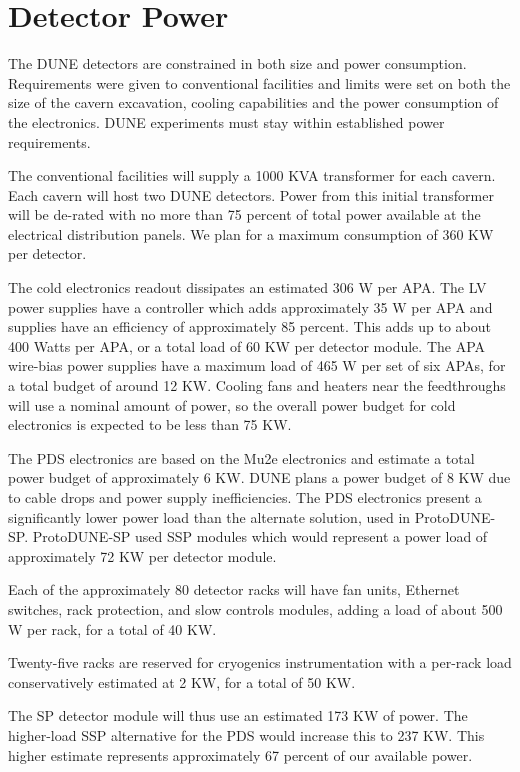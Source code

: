 \section{Detector Power}
\label{sec:fdsp-coord-faci-power}

The DUNE detectors are constrained in both size and power consumption.  Requirements were given to conventional facilities and limits were set on both the size of the cavern excavation, cooling capabilities and the power consumption of the electronics. DUNE experiments must stay within established power requirements.

The conventional facilities will supply a 1000 KVA transformer for each cavern.  Each cavern will host two DUNE detectors.  Power from this initial transformer will be de-rated with no more than 75 percent of total power available at the electrical distribution panels.  We plan for a maximum consumption of 360 KW per detector.

The cold electronics readout dissipates an estimated 306 W per APA. The LV power supplies have a controller which adds approximately 35 W per
APA and supplies have an efficiency of approximately 85 percent. This adds up to about 400 Watts per APA, or a total load of 60 KW per detector module. The APA wire-bias power supplies have a maximum load of 465 W per set of six APAs, for a total budget of around 12 KW. Cooling
fans and heaters near the feedthroughs will use a nominal amount of power, so the overall power budget for cold electronics is expected to be less than 75 KW.

The PDS electronics are based on the Mu2e electronics and estimate a total power budget of approximately 6 KW. DUNE plans a power budget of 8 KW due to cable drops and power supply inefficiencies.  The PDS electronics present a significantly lower power load than the alternate solution, used in ProtoDUNE-SP.  ProtoDUNE-SP used SSP modules which would represent a power load of approximately 72 KW per detector module.

Each of the approximately 80 detector racks will have fan units, Ethernet switches, rack protection, and slow controls modules, adding a load of about 500 W per rack, for a total of 40 KW.

Twenty-five racks are reserved for cryogenics instrumentation with a per-rack load conservatively estimated at 2 KW, for a total of 50 KW.

The SP detector module will thus use an estimated 173 KW of power. The higher-load SSP alternative for the PDS would increase this to 237 KW. This higher estimate represents approximately 67 percent of our available power.

